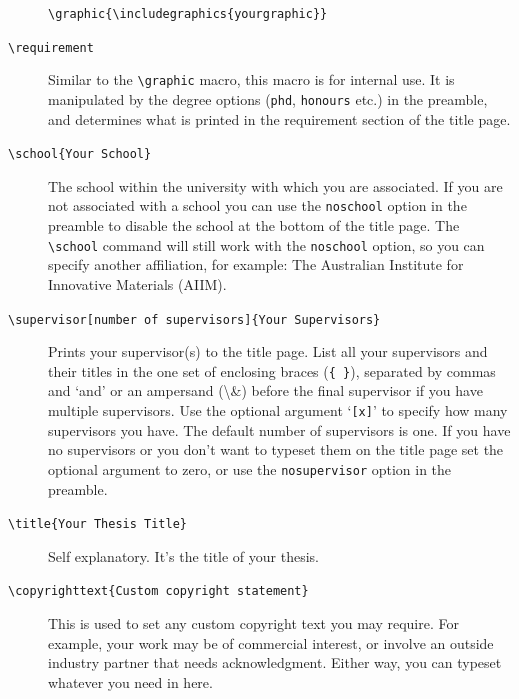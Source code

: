 \documentclass[12pt,oneside]{article}
\newcommand{\option}[1]{\texttt{\color{UOWblue}#1}}
\newcommand{\command}[1]{\texttt{\color{UOWred}#1}}
\newcommand{\comoptions}[1]{\texttt{\color{UOWdarkblue}#1}}
\begin{document}
\begin{description}
    \command{\textbackslash{}graphic}\comoptions{\{\textbackslash{}includegraphics\{yourgraphic\}\}}
    
    \item[\command{\textbackslash{}requirement}] Similar to the \command{\textbackslash{}graphic} macro, this macro is for internal use. It is manipulated by the degree options (\option{phd}, \option{honours} etc.) in the preamble, and determines what is printed in the requirement section of the title page.
    
    \item[\command{\textbackslash{}school}\comoptions{\{Your School\}}] The school within the university with which you are associated. If you are not associated with a school you can use the \option{noschool} option in the preamble to disable the school at the bottom of the title page. The \option{\textbackslash{}school} command will still work with the \option{noschool} option, so you can specify another affiliation, for example: The Australian Institute for Innovative Materials (AIIM).
    
    \item[\command{\textbackslash{}supervisor}\option{[number of supervisors]}\comoptions{\{Your Supervisors\}}] Prints your supervisor(s) to the title page. List all your supervisors and their titles in the one set of enclosing braces (\comoptions{\{~\}}), separated by commas and `and' or an ampersand (\textbackslash{}\&) before the final supervisor if you have multiple supervisors. Use the optional argument `\option{[x]}' to specify how many supervisors you have. The default number of supervisors is one. If you have no supervisors or you don't want to typeset them on the title page set the optional argument to zero, or use the \option{nosupervisor} option in the preamble.
    
    \item[\command{\textbackslash{}title}\comoptions{\{Your Thesis Title\}}] Self explanatory. It's the title of your thesis.
    
    \item[\command{\textbackslash{}copyrighttext}\comoptions{\{Custom copyright statement\}}] This is used to set any custom copyright text you may require. For example, your work may be of commercial interest, or involve an outside industry partner that needs acknowledgment. Either way, you can typeset whatever you need in here. 
    

\end{description}
\end{document}
